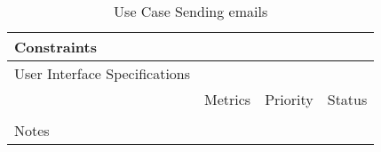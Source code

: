 \begin{table}[H]
\begin{tabularx}{\linewidth}{|l|X|X|X|}
    \hline Constraints                   & \multicolumn{3}{l|}{}                                                                                 \\

    \hline User Interface Specifications & \multicolumn{3}{l|}{}                                                                                 \\

    \hline \multirow{2}{*}{}             & Metrics                                                                           & Priority & Status \\
    \cline{2-4}                          &                                                                                   &          &        \\
    \hline Notes                         & \multicolumn{3}{l|}{}                                                                                 \\
    \hline
  \end{tabularx}
  \caption{Use Case Sending emails}
  \label{tab:use_case_sending_emails}
\end{table}

